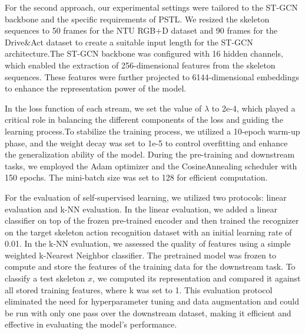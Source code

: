 For the second approach, our experimental settings were tailored to the ST-GCN backbone and the specific requirements of PSTL. We resized the skeleton sequences to 50 frames for the NTU RGB+D dataset and 90 frames for the Drive\&Act dataset to create a suitable input length for the ST-GCN architecture.The ST-GCN backbone was configured with 16 hidden channels, which enabled the extraction of 256-dimensional features from the skeleton sequences. These features were further projected to 6144-dimensional embeddings to enhance the representation power of the model.

In the loss function of each stream, we set the value of $\lambda$ to 2e-4, which played a critical role in balancing the different components of the loss and guiding the learning process.To stabilize the training process, we utilized a 10-epoch warm-up phase, and the weight decay was set to 1e-5 to control overfitting and enhance the generalization ability of the model. During the pre-training and downstream tasks, we employed the Adam optimizer and the CosineAnnealing scheduler with 150 epochs. The mini-batch size was set to 128 for efficient computation.

For the evaluation of self-supervised learning, we utilized two protocols: linear evaluation and k-NN evaluation. In the linear evaluation, we added a linear classifier on top of the frozen pre-trained encoder and then trained the recognizer on the target skeleton action recognition dataset with an initial learning rate of 0.01. In the k-NN evaluation, we assessed the quality of features using a simple weighted k-Nearest Neighbor classifier. The pretrained model was frozen to compute and store the features of the training data for the downstream task. To classify a test skeleton $x$, we computed its representation and compared it against all stored training features, where k was set to 1. This evaluation protocol eliminated the need for hyperparameter tuning and data augmentation and could be run with only one pass over the downstream dataset, making it efficient and effective in evaluating the model's performance.

